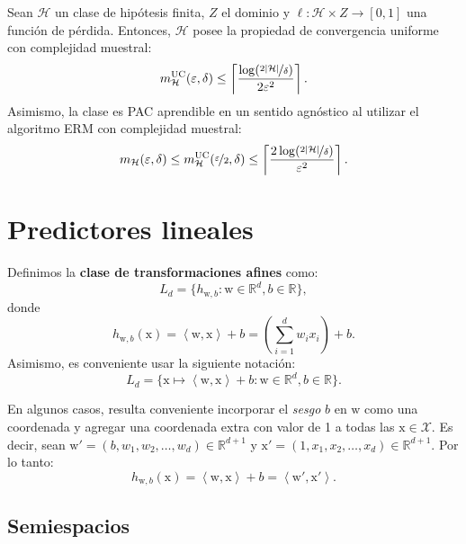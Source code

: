 \documentclass[8pt,a4paper]{extarticle}
\begin{document}
\begin{multicols}{3}
	\begin{boxcor}[]
		Sean $\mathcal{H}$ un clase de hipótesis finita, $Z$ el dominio y  $ \ell : \mathcal{H} \times Z \to [0,1]$ una función de pérdida. Entonces, $\mathcal{H}$ posee la propiedad de convergencia uniforme con complejidad muestral:
		\[
			m_{\mathcal{H}}^{\text{\normalfont UC}} (\varepsilon, \delta) \le \left\lceil \frac{\log(\nicefrac{2\left| \mathcal{H} \right| }{\delta})}{2\varepsilon^2} \right\rceil
			.\]
		Asimismo, la clase es PAC aprendible en un sentido agnóstico al utilizar el algoritmo ERM con complejidad muestral:
		\[
			m_{\mathcal{H}} (\varepsilon, \delta) \le m_{\mathcal{H}}^{\text{\normalfont UC}} (\nicefrac{\varepsilon}{2}, \delta) \le \left\lceil \frac{2\log(\nicefrac{2\left| \mathcal{H} \right| }{\delta})}{\varepsilon^2} \right\rceil
			.\]
	\end{boxcor}

	\newpage

	\section{Predictores lineales}

	\begin{boxdef}
		Definimos la \textbf{clase de transformaciones afines} como:
		\[
			L_{d} = \{ h_{\mathrm{w}, b} : \mathrm{w} \in \mathbb{R}^d, b \in \mathbb{R} \}
			,\]
		donde
		\[
			h_{\mathrm{w}, b} (\mathrm{x}) = \left< \mathrm{w}, \mathrm{x} \right> + b = \left( \sum_{i = 1}^{d} w_i x_i \right) + b
			.\]
		Asimismo, es conveniente usar la siguiente notación:
		\[
			L_{d} = \{ \mathrm{x} \mapsto \left< \mathrm{w}, \mathrm{x} \right> + b : \mathrm{w} \in \mathbb{R}^d, b \in \mathbb{R} \}
			.\]
	\end{boxdef}

	\begin{boxrmk}[]
		En algunos casos, resulta conveniente incorporar el \emph{sesgo} $b$ en  $ \mathrm{w}$ como una coordenada y agregar una coordenada extra con valor de 1 a todas las $ \mathrm{x}  \in \mathcal{X}$. Es decir, sean $ \mathrm{w}' = (b, w_1, w_2, \ldots, w_d) \in \mathbb{R}^{d + 1}$ y $ \mathrm{x}' = (1, x_1, x_2, \ldots, x_d) \in \mathbb{R}^{d + 1}$. Por lo tanto:
		\[
			h_{\mathrm{w}, b} (\mathrm{x}) = \left< \mathrm{w}, \mathrm{x} \right> + b = \left< \mathrm{w}', \mathrm{x}' \right>
			.\]
	\end{boxrmk}

	\subsection{Semiespacios}


\end{multicols}
\end{document}
